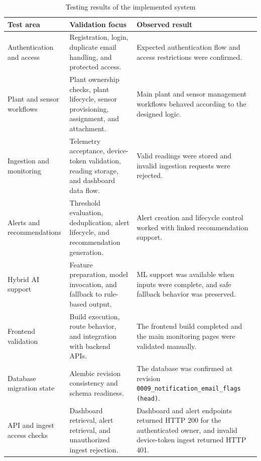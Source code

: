 \begin{table}[H]
\centering
\caption{Testing results of the implemented system}
\label{tab:testing-results}
\begin{tabular}{p{}p{}p{}}
\hline
\textbf{Test area} & \textbf{Validation focus} & \textbf{Observed result} \\
\hline
Authentication and access & Registration, login, duplicate email handling, and protected access. & Expected authentication flow and access restrictions were confirmed. \\
Plant and sensor workflows & Plant ownership checks, plant lifecycle, sensor provisioning, assignment, and attachment. & Main plant and sensor management workflows behaved according to the designed logic. \\
Ingestion and monitoring & Telemetry acceptance, device-token validation, reading storage, and dashboard data flow. & Valid readings were stored and invalid ingestion requests were rejected. \\
Alerts and recommendations & Threshold evaluation, deduplication, alert lifecycle, and recommendation generation. & Alert creation and lifecycle control worked with linked recommendation support. \\
Hybrid AI support & Feature preparation, model invocation, and fallback to rule-based output. & ML support was available when inputs were complete, and safe fallback behavior was preserved. \\
Frontend validation & Build execution, route behavior, and integration with backend APIs. & The frontend build completed and the main monitoring pages were validated manually. \\
Database migration state & Alembic revision consistency and schema readiness. & The database was confirmed at revision \texttt{0009\_notification\_email\_flags (head)}. \\
API and ingest access checks & Dashboard retrieval, alert retrieval, and unauthorized ingest rejection. & Dashboard and alert endpoints returned HTTP 200 for the authenticated owner, and invalid device-token ingest returned HTTP 401. \\
\hline
\end{tabular}
\end{table}
